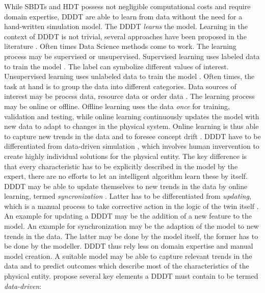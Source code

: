 While SBDTs and HDT possess not negligible computational costs and require domain expertise, DDDT are able to learn from data without the need for a hand-written simulation model. The DDDT \textit{learns} the model. Learning in the context of DDDT is not trivial, several approaches have been proposed in the literature \parencite{he2019data,Friederich2022,francis2021towards}. Often times Data Science methods come to work. The learning process may be supervised or unsupervised. Supervised learning uses labeled data to train the model \parencite{cunningham2008supervised}. The label can symbolize different values of interest. Unsupervised learning uses unlabeled data to train the model \parencite{barlow1989unsupervised}. Often times, the task at hand is to group the data into different categories. Data sources of interest may be process data, resource data or order data \parencite{Biesinger2019}.
The learning process may be online or offline. Offline learning uses the data \textit{once} for training, validation and testing, while online learning continuously updates the model with new data to adapt to changes in the physical system. Online learning is thus able to capture new trends in the data and to foresee concept drift \parencite{tsymbal2004problem}. DDDT have to be differentiated from data-driven simulation \parencite{Charpentier2014}, which involves human invervention to create highly individual solutions for the physical entity. The key difference is that every characteristic has to be explicitly described in the model by the expert, there are no efforts to let an intelligent algorithm learn these by itself. DDDT may be able to update themselves to new trends in the data by online learning, termed \textit{syncronization} \parencite{reinhardt2019survey}. Latter has to be differentiated from \textit{updating}, which is a manual process to take corrective action in the logic of the twin itself \parencite{schwede2024learning}. An example for updating a DDDT may be the addition of a new feature to the model. An example for synchronization may be the adaption of the model to new trends in the data. The latter may be done by the model itself, the former has to be done by the modeller.
DDDT thus rely less on domain expertise and manual model creation. A suitable model may be able to capture relevant trends in the data and to predict outcomes which describe most of the characteristics of the physical entity. \parencite{francis2021towards} propose several key elements a DDDT must contain to be termed \textit{data-driven}:


